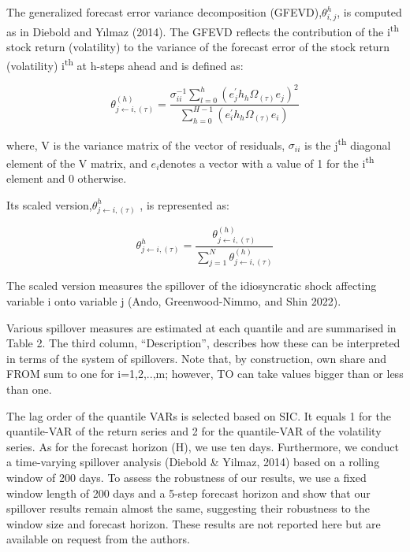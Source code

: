 \documentclass[
  letterpaper,
  DIV=11,
  numbers=noendperiod]{scrartcl}
\begin{document}
The generalized forecast error variance decomposition
(GFEVD),\(\theta^h_{i,j}\), is computed as in Diebold and Yılmaz (2014).
The GFEVD reflects the contribution of the i\textsuperscript{th} stock
return (volatility) to the variance of the forecast error of the stock
return (volatility) i\textsuperscript{th} at h-steps ahead and is
defined as:

\[
\theta^{(h)}_{j \leftarrow i,(\tau)}= \frac{\sigma_{ii}^{-1}\sum_{l=0}^{h}(e_j^{'}h_h \Omega_{(\tau)} e_j)^2}{\sum_{h=0}^{H-1}(e_i^{'}h_h \Omega_{(\tau)} e_i)}
\]

where, V is the variance matrix of the vector of residuals,
\(\sigma_{ii}\) is the j\textsuperscript{th} diagonal element of the V
matrix, and \(e_i\)denotes a vector with a value of 1 for the
i\textsuperscript{th} element and 0 otherwise.

Its scaled version,\(\theta_{j\leftarrow i,(\tau)}^h\) , is represented
as:

\[
\theta_{j\leftarrow i,(\tau)}^h=\frac{\theta^{(h)}_{j \leftarrow i,(\tau)}}{\sum_{j=1}^N \theta^{(h)}_{j \leftarrow i,(\tau)}}
\]

The scaled version measures the spillover of the idiosyncratic shock
affecting variable i onto variable j (Ando, Greenwood-Nimmo, and Shin
2022).

Various spillover measures are estimated at each quantile and are
summarised in Table 2. The third column, ``Description'', describes how
these can be interpreted in terms of the system of spillovers. Note
that, by construction, own share and FROM sum to one for i=1,2,..,m;
however, TO can take values bigger than or less than one.

The lag order of the quantile VARs is selected based on SIC. It equals 1
for the quantile-VAR of the return series and 2 for the quantile-VAR of
the volatility series. As for the forecast horizon (H), we use ten days.
Furthermore, we conduct a time-varying spillover analysis (Diebold \&
Yilmaz, 2014) based on a rolling window of 200 days. To assess the
robustness of our results, we use a fixed window length of 200 days and
a 5-step forecast horizon and show that our spillover results remain
almost the same, suggesting their robustness to the window size and
forecast horizon. These results are not reported here but are available
on request from the authors.
\end{document}

